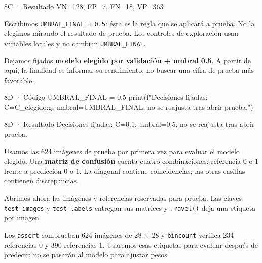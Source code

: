 \begin{Salida}{8C · Resultado}
VN=128, FP=7, FN=18, VP=363
\end{Salida}

\label{paso-8d}

Escribimos \texttt{\small UMBRAL\_\allowbreak{}FINAL =\allowbreak{} 0.\allowbreak{}5}: ésta es la regla que se aplicará a prueba. No la elegimos mirando el resultado de prueba. Los controles de exploración usan variables locales y no cambian \texttt{\small UMBRAL\_\allowbreak{}FINAL}.

Dejamos fijados \textbf{modelo elegido por validación + umbral 0.5}. A partir de aquí, la finalidad es informar su rendimiento, no buscar una cifra de prueba más favorable.


\begin{Codigo}{8D · Código}
UMBRAL_FINAL = 0.5
print(f"Decisiones fijadas: C={C_elegido:g}; umbral={UMBRAL_FINAL}; no se reajusta tras abrir prueba.")
\end{Codigo}

\begin{Salida}{8D · Resultado}
Decisiones fijadas: C=0.1; umbral=0.5; no se reajusta tras abrir prueba.
\end{Salida}

\label{bloque-9}

Usamos las 624 imágenes de prueba por primera vez para evaluar el modelo elegido. Una \textbf{matriz de confusión} cuenta cuatro combinaciones: referencia 0 o 1 frente a predicción 0 o 1. La diagonal contiene coincidencias; las otras casillas contienen discrepancias.


\label{paso-9a}

Abrimos ahora las imágenes y referencias reservadas para prueba. Las claves \texttt{\small test\_\allowbreak{}images} y \texttt{\small test\_\allowbreak{}labels} entregan sus matrices y \texttt{\small .\allowbreak{}ravel(\allowbreak{})\allowbreak{}} deja una etiqueta por imagen.

Los \texttt{\small assert} comprueban 624 imágenes de 28 $\times$ 28 y \texttt{\small bincount} verifica 234 referencias 0 y 390 referencias 1. Usaremos esas etiquetas para evaluar después de predecir; no se pasarán al modelo para ajustar pesos.


